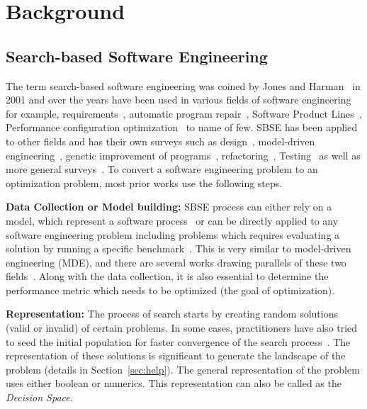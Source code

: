 \documentclass[table, xcdraw, sigconf,review, anonymous]{acmart}
\begin{document}
\section{Background}

\subsection{Search-based Software Engineering}
The term search-based software engineering was coined by Jones and Harman~\cite{harman2001search} in 2001 and over the years have been used in various fields of software engineering for example, requirements~\cite{ZhangHL13, chen2017beyond}, automatic program repair~\cite{le2012genprog}, Software Product Lines~\cite{chen2017sampling, sayyad2013value, guo2017smtibea}, Performance configuration optimization~\cite{nair2017using, guo2017data, oh2017finding, nair2018finding} to name of few. SBSE has been applied to other fields and has their own surveys such as design~\cite{raiha2010survey}, model-driven engineering~\cite{boussaid2017survey}, genetic improvement of programs~\cite{petke2017genetic}, refactoring~\cite{mariani2017systematic}, Testing~\cite{silva2017systematic, khari2017extensive} as well as more general surveys~\cite{clarke2003reformulating, harman2007current}. To convert a software engineering problem to an optimization problem, most prior works use the following steps.

\noindent\textbf{Data Collection or Model building: } SBSE process can either rely on a model, which represent a software process~\cite{boehm1995cost} or can be directly applied to any software engineering problem including problems which requires evaluating a solution by running a specific benchmark~\cite{krall2015gale}. This is very similar to model-driven engineering (MDE), and there are several works drawing parallels of these two fields~\cite{boussaid2017survey, kessentini2013searching}. Along with the data collection, it is also essential to determine the performance metric which needs to be optimized (the goal of optimization).

\noindent\textbf{Representation: } The process of search starts by creating random solutions (valid or invalid) of certain problems. In some cases, practitioners have also tried to seed the initial population for faster convergence of the search process~\cite{saber2017seeding, chen2017beyond, chen2017sampling, henard2015combining}. The representation of these solutions is significant to generate the landscape of the problem (details in Section~\ref{sec:help}). The general representation of the problem uses either boolean or numerics. This representation can also be called as the \textit{Decision Space}.
\end{document}
